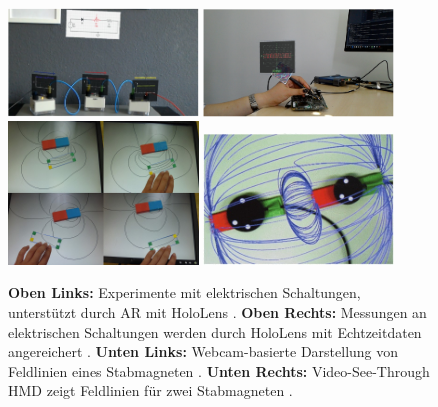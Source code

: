 \begin{figure}[h!]
	\centering
	\includegraphics[width=0.45\textwidth]{images/papers/Amiraslanov18.png}
	\hspace{0.05cm}
	\includegraphics[width=0.45\textwidth]{images/papers/Javaheri18.png}
	\vspace{0.05cm}
	\includegraphics[width=0.45\textwidth]{images/papers/Matsutomo13.jpg}
	\hspace{0.05cm}
	\includegraphics[width=0.45\textwidth]{images/papers/Mannuss11.jpg}
	\caption{\textbf{Oben Links:} Experimente mit elektrischen Schaltungen, unterstützt durch AR mit HoloLens \cite{Amiraslanov18}. \textbf{Oben Rechts:} Messungen an elektrischen Schaltungen werden durch HoloLens mit Echtzeitdaten angereichert \cite{Javaheri18}. \textbf{Unten Links:} Webcam-basierte Darstellung von Feldlinien eines Stabmagneten \cite{Matsutomo13}. \textbf{Unten Rechts:} Video-See-Through HMD zeigt Feldlinien für zwei Stabmagneten \cite{Mannuss11}.}
	\label{img:paper-collection}
\end{figure}

